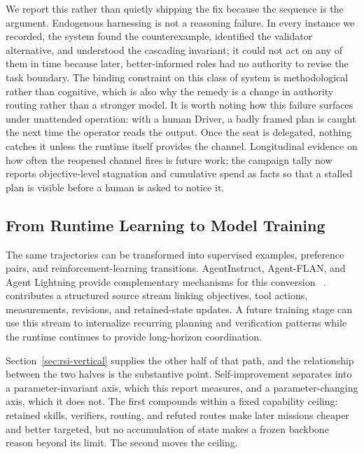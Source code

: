 We report this rather than quietly shipping the fix because the sequence is the
argument. Endogenous harnessing is not a reasoning failure. In every instance we
recorded, the system found the counterexample, identified the validator alternative,
and understood the cascading invariant; it could not act on any of them in time
because later, better-informed roles had no authority to revise the task boundary.
The binding constraint on this class of system is methodological rather than
cognitive, which is also why the remedy is a change in authority routing rather than
a stronger model. It is worth noting how this failure surfaces under unattended
operation: with a human Driver, a badly framed plan is caught the next time the
operator reads the output. Once the seat is delegated, nothing catches it unless the
runtime itself provides the channel. Longitudinal evidence on how often the reopened
channel fires is future work; the campaign tally now reports objective-level
stagnation and cumulative spend as facts so that a stalled plan is visible before a
human is asked to notice it.

\subsection{From Runtime Learning to Model Training}
\label{sec:runtime-to-training}

The same trajectories can be transformed into supervised examples, preference
pairs, and reinforcement-learning transitions. AgentInstruct, Agent-FLAN, and
Agent Lightning provide complementary mechanisms for this conversion
~\citep{mitra2024agentinstruct,chen2024agentflan,luo2025agentlightning}.
\systemname contributes a structured source stream linking objectives, tool actions,
measurements, revisions, and retained-state updates. A future training stage can use
this stream to internalize recurring planning and verification patterns while the
runtime continues to provide long-horizon coordination.

Section~\ref{sec:rsi-vertical} supplies the other half of that path, and the
relationship between the two halves is the substantive point. Self-improvement
separates into a parameter-invariant axis, which this report measures, and a
parameter-changing axis, which it does not. The first compounds within a fixed
capability ceiling: retained skills, verifiers, routing, and refuted routes make
later missions cheaper and better targeted, but no accumulation of state makes a
frozen backbone reason beyond its limit. The second moves the ceiling.

